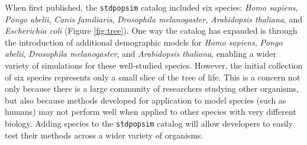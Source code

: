 \documentclass[hidelinks]{article}
\newcommand{\stdpopsim}{\texttt{stdpopsim}\xspace}
\begin{document}
When first published, the \stdpopsim catalog included six species:
\emph{Homo sapiens}, \emph{Pongo abelii}, \emph{Canis familiaris}, \emph{Drosophila melanogaster},
\emph{Arabidopsis thaliana}, and \emph{Escherichia coli} (Figure \ref{fig:tree}).
One way the catalog has expanded is through the introduction of additional demographic models
for \emph{Homo sapiens}, \emph{Pongo abelii}, \emph{Drosophila melanogaster},
and \emph{Arabidopsis thaliana}, enabling a wider variety of simulations for these
well-studied species.
However, the initial collection of six species represents only a small slice of the tree of life.
This is a concern
not only because there is a large community of researchers studying other organisms,
but also because methods developed for application to model species (such as humans)
may not perform well when applied to other species with very different biology.
Adding species to the \stdpopsim catalog will allow developers to easily test their methods across a wider variety of organisms.
\end{document}
